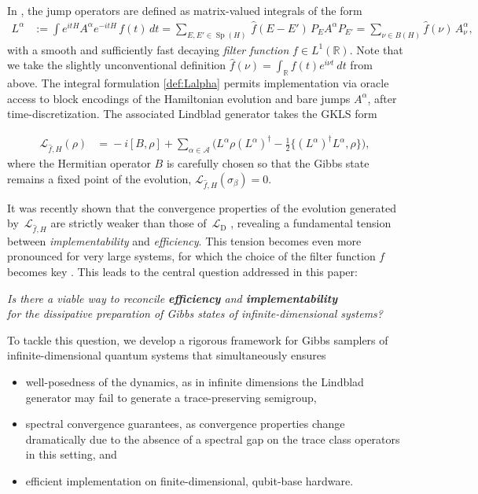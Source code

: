 \documentclass[11pt]{amsart}
\newcommand{\1}{\mathbbm{1}}
\theoremstyle{plain}
\theoremstyle{definition}
\theoremstyle{remark}
\numberwithin{equation}{section}
\begin{document}
In \cite{ding2025efficient}, the jump operators are defined as matrix-valued integrals of the form
\begin{align}
L^\alpha
&:= \int e^{itH} A^\alpha e^{-itH}\, {f}(t)\, dt = \sum_{E,E'\in\operatorname{Sp}(H)} \,\widehat{f}(E{-}E')\, P_E A^\alpha P_{E'} = \sum_{\nu\in B(H)}\widehat{f}(\nu)\, A^\alpha_\nu,\label{def:Lalpha}
\end{align}
with a smooth and sufficiently fast decaying \textit{filter function} $f\in L^1(\mathbb{R})$. Note that we take the slightly unconventional definition $\widehat{f}(\nu) =\int_{\mathbb R} f(t) e^{i\nu t} \ dt$ from \cite{ding2025efficient} above. The integral formulation \eqref{def:Lalpha} permits implementation via oracle access to block encodings of the Hamiltonian evolution and bare jumps $A^\alpha$, after time-discretization. The associated Lindblad generator takes the GKLS form

\vspace{- 0.1 in}

\begin{align}\label{eq:GKLS}
\!\!\!\mathcal{L}_{\widehat{f},H}(\rho)
\!&=\! \!-i[B,\rho]
 + \!\!\sum_{\alpha\in\mathcal{A}}\!\! \Big( L^\alpha \rho(L^\alpha)^\dagger
 \!-\! \tfrac{1}{2}\{(L^\alpha)^\dagger L^\alpha, \rho\} \Big),
\end{align}
where the Hermitian operator $B$ is carefully chosen so that the Gibbs state remains a fixed point of the evolution, $\mathcal{L}_{\widehat{f},H}(\sigma_\beta)=0$.


It was recently shown that the convergence properties of the evolution generated by~$\mathcal{L}_{\widehat{f},H}$ are strictly weaker than those of~$\mathcal{L}_{\mathrm D}$ \cite{slezak2026polynomial}, revealing a fundamental tension between \emph{implementability} and \emph{efficiency}. This tension becomes even more pronounced for very large systems, for which the choice of the filter function $f$ becomes key \cite{rouze2024efficient}. This leads to the central question addressed in this paper:
\begin{center}
\textit{Is there a viable way to reconcile \textbf{efficiency} and \textbf{implementability} \\for the dissipative preparation of Gibbs states of infinite-dimensional systems?}
\end{center}

\noindent
To tackle this question, we develop a rigorous framework for Gibbs samplers of infinite-dimensional quantum systems that simultaneously ensures
\begin{itemize}
\item well-posedness of the dynamics, as in infinite dimensions the Lindblad generator may fail to generate a trace-preserving semigroup,
\item spectral convergence guarantees, as convergence properties change dramatically due to the absence of a spectral gap on the trace class operators in this setting, and
\item efficient implementation on finite-dimensional, qubit-base hardware.
\end{itemize}
\end{document}
